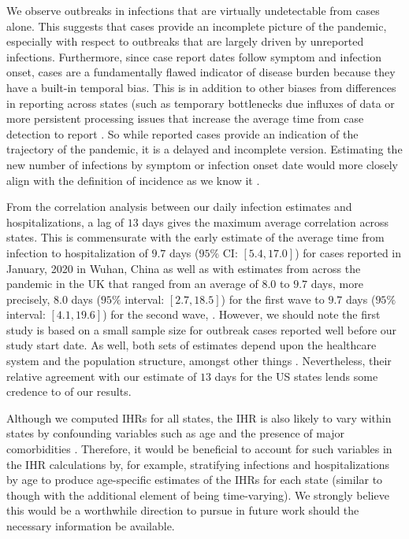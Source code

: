 \documentclass{article}
\begin{document}
We observe outbreaks in infections that are virtually undetectable from cases alone. This suggests that cases provide an incomplete picture of the pandemic, especially with respect to outbreaks that are largely driven by unreported infections. Furthermore, since case report dates follow symptom and infection onset, cases are a fundamentally flawed indicator of disease burden because they have a built-in temporal bias. This is in addition to other biases from differences in reporting across states (such as temporary bottlenecks due influxes of data or more persistent processing issues that increase the average time from case detection to report \citep{wash2020dash, dunkel2020covid19}. So while reported cases provide an indication of the trajectory of the pandemic, it is a delayed and incomplete version. Estimating the new number of infections by symptom or infection onset date would more closely align with the definition of incidence as we know it \citep{jahja2022real}.

From the correlation analysis between our daily infection estimates and hospitalizations, a lag of $13$ days gives the maximum average correlation across states. This is commensurate with the early estimate of the average time from infection to hospitalization of $9.7$ days ($95\%$ CI: $[5.4, 17.0]$) for cases reported in January, 2020 in Wuhan, China as well as with estimates from across the pandemic in the UK that ranged from an average of $8.0$ to $9.7$ days, more precisely, $8.0$ days ($95\%$ interval: $[2.7, 18.5]$) for the first wave to $9.7$ days ($95\%$ interval: $[4.1, 19.6]$) for the second wave, \citep{ward2021understanding}. However, we should note the first study is based on a small sample size for outbreak cases reported well before our study start date. As well, both sets of estimates depend upon the healthcare system and the population structure, amongst other things \citep{ward2021understanding}. Nevertheless, their relative agreement with our estimate of $13$ days for the US states lends some credence to of our results. 

Although we computed IHRs for all states, the IHR is also likely to vary within states by confounding variables such as age and the presence of major comorbidities \citep{russell2023comorbidities}. Therefore, it would be beneficial to account for such variables in the IHR calculations by, for example, stratifying infections and hospitalizations by age to produce age-specific estimates of the IHRs for each state (similar to \citealt{fox2023disproportionate} though with the additional element of being time-varying). We strongly believe this would be a worthwhile direction to pursue in future work should the necessary information be available. 
\end{document}
